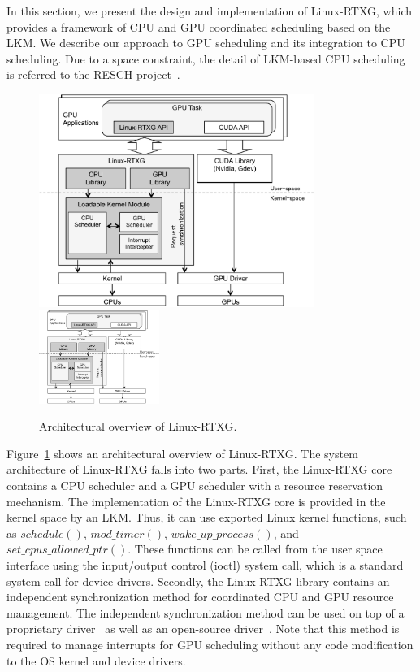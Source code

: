 \label{sec:design_imple}
In this section, we present the design and implementation of Linux-RTXG,
which provides a framework of  CPU and GPU coordinated scheduling based
on the LKM.
We describe our approach to GPU scheduling and its integration to CPU
scheduling.
Due to a space constraint, the detail of LKM-based CPU scheduling is
referred to the RESCH project~\cite{kato2009loadable, asberg2012exsched}.

\begin{figure}[t]
\begin{center}
\ifthesis
\includegraphics[width=0.8\textwidth]{img/overview.pdf}
\else
\includegraphics[width=0.35\textwidth]{img/overview.pdf}
\fi
\caption{Architectural overview of Linux-RTXG.}
\label{fig:overview}
\end{center}
\end{figure}

Figure~\ref{fig:overview} shows an architectural overview of
Linux-RTXG.
The system architecture of Linux-RTXG falls into two parts.
First, the Linux-RTXG core contains a CPU scheduler and a GPU scheduler
with a resource reservation mechanism.
The implementation of the Linux-RTXG core is provided in the kernel
space by an LKM.
Thus, it can use exported Linux kernel functions, such as $schedule()$,
$mod\_timer()$, $wake\_up\_process()$, and $set\_cpus\_allowed\_ptr()$.
These functions can be called from the user space interface using the
input/output control (ioctl) system call, which is a standard system
call for device drivers.
Secondly, the Linux-RTXG library contains an independent synchronization
method for coordinated CPU and GPU resource management.
The independent synchronization method can be used on top of a
proprietary driver~\cite{nvidia:cuda_zone} as well as an open-source
driver~\cite{nouveau}.
Note that this method is required to manage interrupts for GPU
scheduling without any code modification to the OS kernel and device
drivers.

